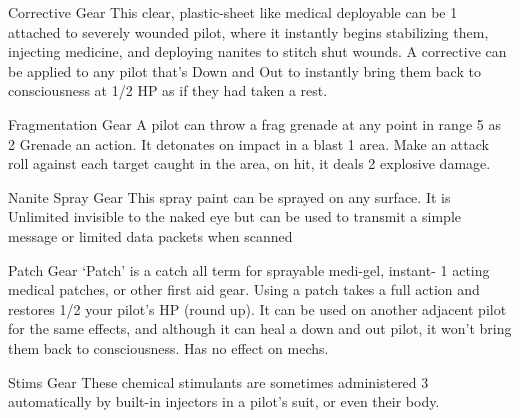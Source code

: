     Corrective             Gear       This clear, plastic-sheet like medical deployable can be                1 
                                       attached to severely wounded pilot, where it instantly  
                                       begins stabilizing them, injecting medicine, and deploying  
                                       nanites to stitch shut wounds. A corrective can be applied  
                                       to any pilot that’s Down and Out to instantly bring them  
                                       back to consciousness at 1/2 HP as if they had taken a  
                                       rest. 

   Fragmentation           Gear       A pilot can throw a frag grenade at any point in range 5 as            2 
    Grenade                            an action. It detonates on impact in a blast 1 area. Make  
                                       an attack roll against each target caught in the area, on  
                                       hit, it deals 2 explosive damage. 

   Nanite Spray            Gear       This spray paint can be sprayed on any surface. It is                   Unlimited 
                                       invisible to the naked eye but can be used to transmit a  
                                       simple message or limited data packets when scanned 

   Patch                   Gear        ‘Patch’ is a catch all term for sprayable medi-gel, instant-           1 
                                       acting medical patches, or other first aid gear. Using a  
                                       patch takes a full action and restores 1/2 your pilot’s HP  
                                       (round up). It can be used on another adjacent pilot for the  
                                       same effects, and although it can heal a down and out  
                                       pilot, it won’t bring them back to consciousness. Has no  
                                       effect on mechs. 

                                                                                                                          


  Stims                   Gear       These chemical stimulants are sometimes administered                   3 
                                     automatically by built-in injectors in a pilot’s suit, or even  
                                     their body. 
 
